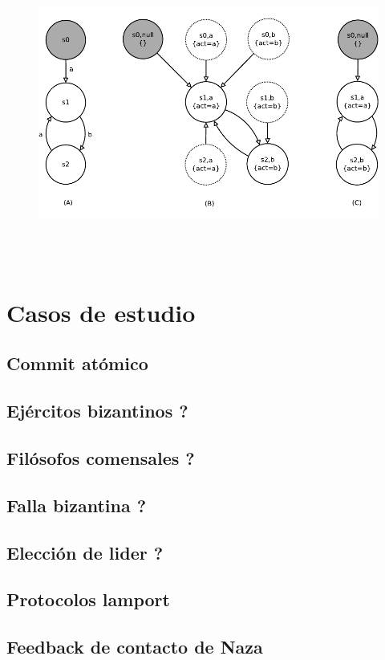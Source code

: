 \documentclass[titlepage, 12pt]{book}
\begin{document}
\begin{figure}[H]
  \centering
    \includegraphics{Imagenes/ltsakripke.pdf}
  \caption{}
  \label{ltsakripke}
\end{figure}
~\\\\








\chapter{Casos de estudio}
			\section{Commit at\'omico}
			\section{Ej\'ercitos bizantinos ?}
			\section{Fil\'osofos comensales ?}
			\section{Falla bizantina ?}
			\section{Elecci\'on de lider ?}
			\section{Protocolos lamport}
			\section{Feedback de contacto de Naza}
\end{document}
